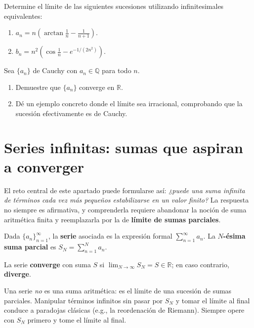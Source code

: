 
\begin{prob}
Determine el límite de las siguientes sucesiones utilizando infinitesimales
equivalentes:
\begin{enumerate}
  \item $\displaystyle a_n = n\left(\arctan\frac{1}{n} - \frac{1}{n+1}\right)$.
  \item $\displaystyle b_n = n^2\!\left(\cos\frac{1}{n} -
        e^{-1/(2n^2)}\right)$.
\end{enumerate}
\end{prob}

\begin{prob}
Sea $\{a_n\}$ de Cauchy con $a_n \in \mathbb{Q}$ para todo $n$.
\begin{enumerate}
  \item Demuestre que $\{a_n\}$ converge en $\mathbb{R}$.
  \item Dé un ejemplo concreto donde el límite sea irracional,
        comprobando que la sucesión efectivamente es de Cauchy.
\end{enumerate}
\end{prob}


\section{Series infinitas: sumas que aspiran a converger}

El reto central de este apartado puede formularse así: \emph{¿puede una suma
infinita de términos cada vez más pequeños estabilizarse en un valor finito?}
La respuesta no siempre es afirmativa, y comprenderla requiere abandonar la
noción de suma aritmética finita y reemplazarla por la de \textbf{límite de
sumas parciales}.

\begin{definition}
Dada $\{a_n\}_{n=1}^\infty$, la \textbf{serie} asociada es la expresión
formal $\displaystyle\sum_{n=1}^\infty a_n$. La \textbf{$N$-ésima suma
parcial} es $S_N = \displaystyle\sum_{n=1}^N a_n$.

La serie \textbf{converge} con suma $S$ si $\lim_{N\to\infty} S_N = S \in
\mathbb{R}$; en caso contrario, \textbf{diverge}.
\end{definition}

\begin{rem}
Una serie \emph{no} es una suma aritmética: es el límite de una sucesión
de sumas parciales. Manipular términos infinitos sin pasar por $S_N$ y
tomar el límite al final conduce a paradojas clásicas (e.g., la
reordenación de Riemann). Siempre opere con $S_N$ primero y tome el
límite al final.
\end{rem}

